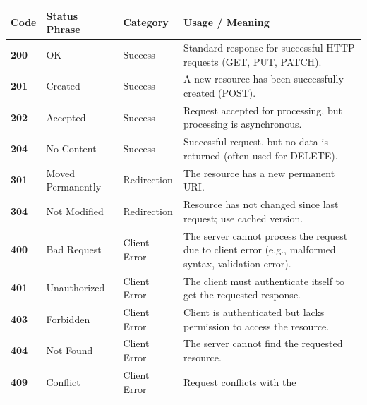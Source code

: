 \begin{longtable}[]{@{}
  >{\raggedright\arraybackslash}p{}
  >{\raggedright\arraybackslash}p{}
  >{\raggedright\arraybackslash}p{}
  >{\raggedright\arraybackslash}p{}@{}}
\toprule\noalign{}
\begin{minipage}[b]{\linewidth}\raggedright
Code
\end{minipage} & \begin{minipage}[b]{\linewidth}\raggedright
Status Phrase
\end{minipage} & \begin{minipage}[b]{\linewidth}\raggedright
Category
\end{minipage} & \begin{minipage}[b]{\linewidth}\raggedright
Usage / Meaning
\end{minipage} \\
\midrule\noalign{}
\endhead
\bottomrule\noalign{}
\endlastfoot
\textbf{200} & OK & Success & Standard response for successful HTTP
requests (GET, PUT, PATCH). \\
\textbf{201} & Created & Success & A new resource has been successfully
created (POST). \\
\textbf{202} & Accepted & Success & Request accepted for processing, but
processing is asynchronous. \\
\textbf{204} & No Content & Success & Successful request, but no data is
returned (often used for DELETE). \\
\textbf{301} & Moved Permanently & Redirection & The resource has a new
permanent URI. \\
\textbf{304} & Not Modified & Redirection & Resource has not changed
since last request; use cached version. \\
\textbf{400} & Bad Request & Client Error & The server cannot process
the request due to client error (e.g., malformed syntax, validation
error). \\
\textbf{401} & Unauthorized & Client Error & The client must
authenticate itself to get the requested response. \\
\textbf{403} & Forbidden & Client Error & Client is authenticated but
lacks permission to access the resource. \\
\textbf{404} & Not Found & Client Error & The server cannot find the
requested resource. \\
\textbf{409} & Conflict & Client Error & Request conflicts with the

\end{longtable}

